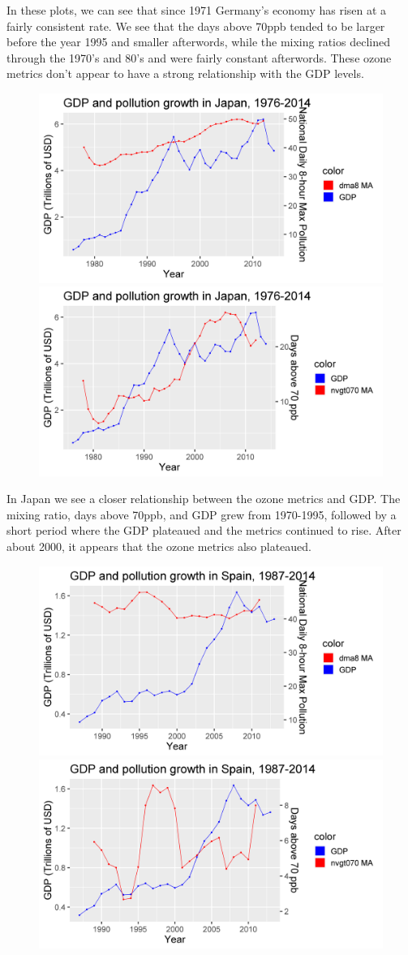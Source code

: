 \documentclass[11pt, oneside]{article}
\theoremstyle{definition}
\begin{document}
In these plots, we can see that since 1971 Germany's economy has risen at a fairly consistent rate. We see that the days above 70ppb tended to be larger before the year 1995 and smaller afterwords, while the mixing ratios declined through the 1970's and 80's and were fairly constant afterwords. These ozone metrics don't appear to have a strong relationship with the GDP levels.

\begin{figure}[ht]
    \centering
    \includegraphics[width=0.45\linewidth]{plots/country_pollution/Japan_dma8.png}
    \includegraphics[width=0.45\linewidth]{plots/country_pollution/Japan_nvgt.png}
    \label{fig:JP}
\end{figure}

In Japan we see a closer relationship between the ozone metrics and GDP. The mixing ratio, days above 70ppb, and GDP grew from 1970-1995, followed by a short period where the GDP plateaued and the metrics continued to rise. After about 2000, it appears that the ozone metrics also plateaued. 

\begin{figure}[ht]
    \centering
    \includegraphics[width=0.45\linewidth]{plots/country_pollution/Spain_dma8.png}
    \includegraphics[width=0.45\linewidth]{plots/country_pollution/Spain_nvgt.png}
    \label{fig:ESP}
\end{figure}
\end{document}
